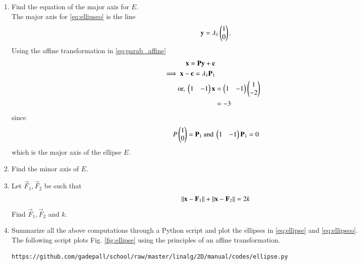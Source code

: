 \documentclass[journal,12pt,twocolumn]{IEEEtran}
\renewcommand\thesection{\arabic{section}}
\begin{document}
\begin{enumerate}[label=\thesection.\arabic*
,ref=\thesection.\theenumi]
\item Find the equation of the major axis for $E$.
\\
\solution  The major axis for \eqref{eq:ellipseo} is the line
\begin{equation}
\mathbf{y} = \lambda_1\begin{pmatrix}1 \\ 0\end{pmatrix}.
\end{equation}
Using the affine transformation in \eqref{eq:parab_affine}
\begin{align}
\mathbf{x}= \mathbf{P}\mathbf{y}+\mathbf{c}
\\ 
\implies  \mathbf{x}-\mathbf{c}= \lambda_1\mathbf{P}_1
\\ 
\text{or, }\begin{pmatrix}1 & -1\end{pmatrix}\mathbf{x}&= \begin{pmatrix}1 & -1\end{pmatrix}\begin{pmatrix}1 \\ -2\end{pmatrix}
\\
&= -3
\end{align}
%
since 
\begin{align}
P\begin{pmatrix}1 \\ 0\end{pmatrix}=\mathbf{P}_1\text{ and } \begin{pmatrix}1 & -1\end{pmatrix}\mathbf{P}_1 = 0
\end{align}
%
which is the major axis of the ellipse $E$.
\item Find the minor axis of $E$.
%
\item Let $\vec{F}_1,\vec{F}_2$ be such that
\begin{equation}
\left\lVert\mathbf{x}-\mathbf{F}_1\right\rVert
+\left\lVert\mathbf{x}-\mathbf{F}_2\right\rVert =2k
\end{equation}
Find $\vec{F}_1, \vec{F}_2$ and $k$.
\item Summarize all the above computations through a Python script and plot 
the ellipses in \eqref{eq:ellipse} and \eqref{eq:ellipseo}.
\\
\solution The following script plots Fig. \ref{fig:ellipse} using the 
principles of an affine transformation. 
\begin{lstlisting}
https://github.com/gadepall/school/raw/master/linalg/2D/manual/codes/ellipse.py
\end{lstlisting}
\begin{figure}
\centering

\end{figure}
\end{enumerate}
\end{document}
